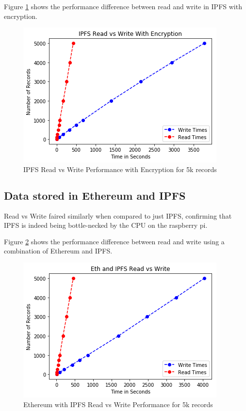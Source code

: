 \documentclass[11pt,openright]{report}
\begin{document}
Figure \ref{fig:graph_ipfs_readvwrite_wencr} shows the performance difference between read and write in IPFS with encryption.
\begin{figure}
	\centering
	\includegraphics[scale=1]{results/IPFS_read_vs_write_wencr.png}
	\caption{IPFS Read vs Write Performance with Encryption for 5k records}
	\label{fig:graph_ipfs_readvwrite_wencr}
\end{figure}

\subsection{Data stored in Ethereum and IPFS}
Read vs Write faired similarly when compared to just IPFS, confirming that IPFS is indeed being bottle-necked by the CPU on the raspberry pi.

Figure \ref{fig:graph_eth_ipfs_readvwrite} shows the performance difference between read and write using a combination of Ethereum and IPFS.

\begin{figure}
	\centering
	\includegraphics[scale=1]{results/Eth_IPFS_read_vs_write.png}
	\caption{Ethereum with IPFS Read vs Write Performance for 5k records}
	\label{fig:graph_eth_ipfs_readvwrite}
\end{figure}
\newpage
\end{document}
